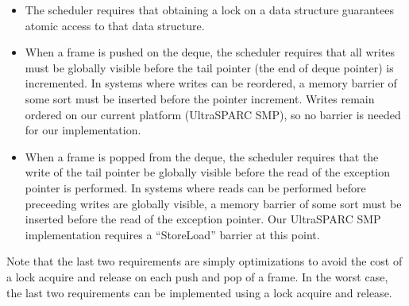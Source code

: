 \begin{itemize}

\item The scheduler requires that obtaining a lock on a data structure
guarantees atomic access to that data structure.

\item When a frame is pushed on the deque, the scheduler requires that
all writes must be globally visible before the tail pointer (the end
of deque pointer) is incremented.  In systems where writes can be
reordered, a memory barrier of some sort must be inserted before the
pointer increment.  Writes remain ordered on our current platform
(UltraSPARC SMP), so no barrier is needed for our implementation.

\item When a frame is popped from the deque, the scheduler requires
that the write of the tail pointer be globally visible before the read
of the exception pointer is performed.  In systems where reads can be
performed before preceeding writes are globally visible, a memory
barrier of some sort must be inserted before the read of the exception
pointer.  Our UltraSPARC SMP implementation requires a ``StoreLoad''
barrier at this point.

\end{itemize}

Note that the last two requirements are simply optimizations to avoid
the cost of a lock acquire and release on each push and pop of a
frame.  In the worst case, the last two requirements can be
implemented using a lock acquire and release.

%
%
%
%
%
%
